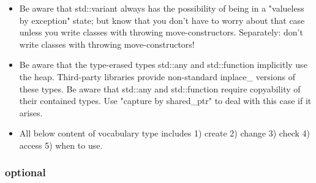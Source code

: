 \documentclass[a4paper,11pt,twoside]{book}
\begin{document}
\begin{itemize}
    \item Be aware that std::variant always has the possibility of being in a "valueless by exception" state; but know that you don't have to worry about that case unless you write classes with throwing move-constructors. Separately: don't write classes with throwing move-constructors! 
        
    \item Be aware that the type-erased types std::any and std::function implicitly use the heap. Third-party libraries provide non-standard inplace\_ versions of these types. Be aware that std::any and std::function require copyability of their contained types. Use "capture by shared\_ptr" to deal with this case if it arises.

    \item All below content of vocabulary type includes 1) create 2) change 3) check 4) access 5) when to use.
\end{itemize}

\subsubsection{optional}
\end{document}
